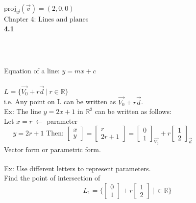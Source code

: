 \documentclass[]{article}
\begin{document}
		proj$_{\vec{w}}(\vec{v})=(2,0,0)$
		\pagebreak\\
		\Large{Chapter 4: Lines and planes}\\
		\normalsize
		{\bf 4.1}\\\\
		\begin{center}
			\\
		\end{center}
		Equation of a line: $y=mx+c$\\\\
		$L=\{\vec{V_0}+r\vec{d}~|~r\in\mathbb{R}\}$\\
		i.e. Any point on L can be written as $\vec{V_0}+r\vec{d}$.\\
		Ex: The line $y=2x+1$ in $\mathbb{R}^2$ can be written as follows:\\
		Let $x=r~\longleftarrow$ parameter\\
		$~~~~~~y=2r+1$
		Then:
		$\begin{bmatrix}
			{x}\\
			{y}
		\end{bmatrix}=
		\begin{bmatrix}
			{r}\\
			{2r+1}
		\end{bmatrix}=
		\begin{bmatrix}
			{0}\\
			{1}
		\end{bmatrix}_{\vec{V_0}}+
		r\begin{bmatrix}
			{1}\\
			{2}
		\end{bmatrix}_{\vec{d}}$\\
		Vector form or parametric form.\\\\
		Ex: Use different letters to represent parameters.\\
		Find the point of intersection of
		$$
			L_1=\{ \begin{bmatrix}{0}\\{1}\end{bmatrix}+r\begin{bmatrix}{1}\\{2}\end{bmatrix}~|~\in\mathbb{R} \}
		$$
\end{document}
